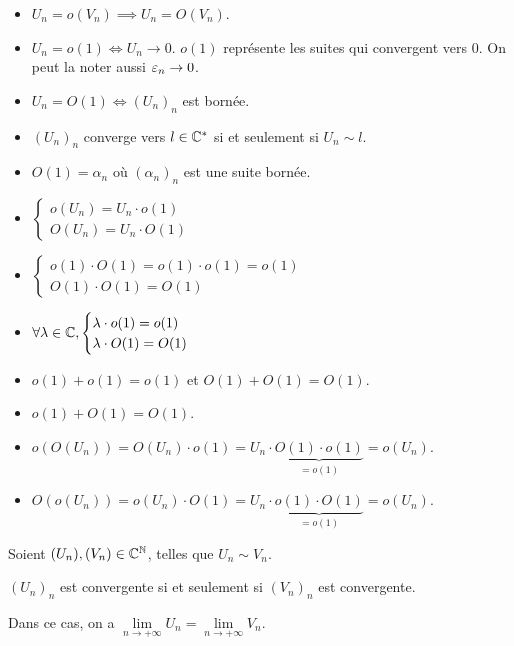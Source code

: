 \documentclass[12pt, a4paper]{report}
\begin{document}
\begin{remark}
    \begin{itemize}
        \item $U_n=o(V_n) \implies U_n=O(V_n)$.
        \item $U_n = o(1) \iff U_n \to 0$. $o(1)$ représente les suites qui convergent vers $0$. On peut la noter aussi $\varepsilon_n \to 0$.
        \item $U_n = O(1) \iff (U_n)_n$ est bornée.
        \item $(U_n)_n$ converge vers $l\in\mathbb{C}^*$ si et seulement si $U_n \sim l$.
        \item $O(1) = \alpha_n$ où $(\alpha_n)_n$ est une suite bornée.
        \item $\begin{cases} o(U_n) = U_n \cdot o(1)\\ O(U_n) = U_n \cdot O(1) \end{cases}$
        \item $\begin{cases}
            o(1)\cdot O(1) =o(1)\cdot o(1)=o(1)\\
            O(1) \cdot O(1) = O(1)
        \end{cases}$
        \item $\forall \lambda \in \mathbb{C}, \begin{cases}
            \lambda \cdot o(1) = o(1)\\
            \lambda \cdot O(1) = O(1)
        \end{cases}$
        \item $o(1) + o(1) = o(1)$ et $O(1) + O(1) = O(1)$.
        \item $o(1) + O(1) = O(1)$.
        \item $o(O(U_n)) = O(U_n)\cdot o(1)=U_n \cdot \underbrace{O(1) \cdot o(1)}_{=o(1)} = o(U_n)$.
        \item $O(o(U_n)) = o(U_n) \cdot O(1) = U_n \cdot \underbrace{o(1) \cdot O(1)}_{=o(1)} = o(U_n)$.
    \end{itemize}
\end{remark}

\begin{property}
    Soient $(U_n),(V_n) \in \mathbb{C}^{\mathbb{N}}$, telles que $U_n \sim V_n$.
    
    $(U_n)_n$ est convergente si et seulement si $(V_n)_n$ est convergente.
    
    Dans ce cas, on a $\lim\limits_{n\to+\infty} U_n = \lim\limits_{n\to+\infty} V_n$.
\end{property}
\end{document}
